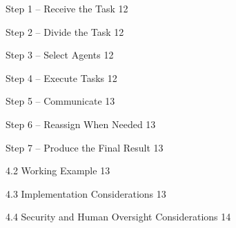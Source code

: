 \documentclass[12pt,letterpaper]{article}
\begin{document}
\noindent\hspace*{56pt} Step 1 – Receive the Task \hfill 12\par
\noindent\hspace*{56pt} Step 2 – Divide the Task \hfill 12\par
\noindent\hspace*{56pt} Step 3 – Select Agents \hfill 12\par
\noindent\hspace*{56pt} Step 4 – Execute Tasks \hfill 12\par
\noindent\hspace*{56pt} Step 5 – Communicate \hfill 13\par
\noindent\hspace*{56pt} Step 6 – Reassign When Needed \hfill 13\par
\noindent\hspace*{56pt} Step 7 – Produce the Final Result \hfill 13\par
\noindent\hspace*{28pt} 4.2 Working Example \hfill 13\par
\noindent\hspace*{28pt} 4.3 Implementation Considerations \hfill 13\par
\noindent\hspace*{28pt} 4.4 Security and Human Oversight Considerations \hfill 14\par
\endgroup
\newpage
\end{document}
